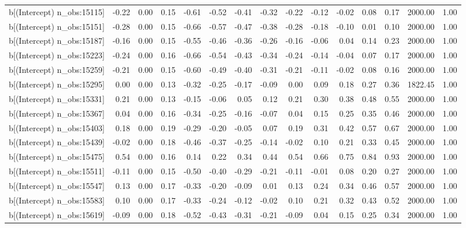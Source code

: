 \begin{table}[ht]
\begin{tabular}{rrrrrrrrrrrrrrr}
  b[(Intercept) n\_obs:15115] & -0.22 & 0.00 & 0.15 & -0.61 & -0.52 & -0.41 & -0.32 & -0.22 & -0.12 & -0.02 & 0.08 & 0.17 & 2000.00 & 1.00 \\ 
  b[(Intercept) n\_obs:15151] & -0.28 & 0.00 & 0.15 & -0.66 & -0.57 & -0.47 & -0.38 & -0.28 & -0.18 & -0.10 & 0.01 & 0.10 & 2000.00 & 1.00 \\ 
  b[(Intercept) n\_obs:15187] & -0.16 & 0.00 & 0.15 & -0.55 & -0.46 & -0.36 & -0.26 & -0.16 & -0.06 & 0.04 & 0.14 & 0.23 & 2000.00 & 1.00 \\ 
  b[(Intercept) n\_obs:15223] & -0.24 & 0.00 & 0.16 & -0.66 & -0.54 & -0.43 & -0.34 & -0.24 & -0.14 & -0.04 & 0.07 & 0.17 & 2000.00 & 1.00 \\ 
  b[(Intercept) n\_obs:15259] & -0.21 & 0.00 & 0.15 & -0.60 & -0.49 & -0.40 & -0.31 & -0.21 & -0.11 & -0.02 & 0.08 & 0.16 & 2000.00 & 1.00 \\ 
  b[(Intercept) n\_obs:15295] & 0.00 & 0.00 & 0.13 & -0.32 & -0.25 & -0.17 & -0.09 & 0.00 & 0.09 & 0.18 & 0.27 & 0.36 & 1822.45 & 1.00 \\ 
  b[(Intercept) n\_obs:15331] & 0.21 & 0.00 & 0.13 & -0.15 & -0.06 & 0.05 & 0.12 & 0.21 & 0.30 & 0.38 & 0.48 & 0.55 & 2000.00 & 1.00 \\ 
  b[(Intercept) n\_obs:15367] & 0.04 & 0.00 & 0.16 & -0.34 & -0.25 & -0.16 & -0.07 & 0.04 & 0.15 & 0.25 & 0.35 & 0.46 & 2000.00 & 1.00 \\ 
  b[(Intercept) n\_obs:15403] & 0.18 & 0.00 & 0.19 & -0.29 & -0.20 & -0.05 & 0.07 & 0.19 & 0.31 & 0.42 & 0.57 & 0.67 & 2000.00 & 1.00 \\ 
  b[(Intercept) n\_obs:15439] & -0.02 & 0.00 & 0.18 & -0.46 & -0.37 & -0.25 & -0.14 & -0.02 & 0.10 & 0.21 & 0.33 & 0.45 & 2000.00 & 1.00 \\ 
  b[(Intercept) n\_obs:15475] & 0.54 & 0.00 & 0.16 & 0.14 & 0.22 & 0.34 & 0.44 & 0.54 & 0.66 & 0.75 & 0.84 & 0.93 & 2000.00 & 1.00 \\ 
  b[(Intercept) n\_obs:15511] & -0.11 & 0.00 & 0.15 & -0.50 & -0.40 & -0.29 & -0.21 & -0.11 & -0.01 & 0.08 & 0.20 & 0.27 & 2000.00 & 1.00 \\ 
  b[(Intercept) n\_obs:15547] & 0.13 & 0.00 & 0.17 & -0.33 & -0.20 & -0.09 & 0.01 & 0.13 & 0.24 & 0.34 & 0.46 & 0.57 & 2000.00 & 1.00 \\ 
  b[(Intercept) n\_obs:15583] & 0.10 & 0.00 & 0.17 & -0.33 & -0.24 & -0.12 & -0.02 & 0.10 & 0.21 & 0.32 & 0.43 & 0.52 & 2000.00 & 1.00 \\ 
  b[(Intercept) n\_obs:15619] & -0.09 & 0.00 & 0.18 & -0.52 & -0.43 & -0.31 & -0.21 & -0.09 & 0.04 & 0.15 & 0.25 & 0.34 & 2000.00 & 1.00 \\ 

\end{tabular}
\end{table}
